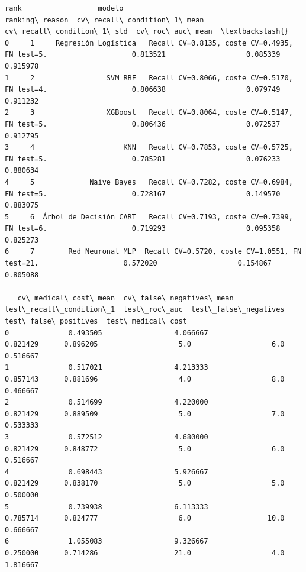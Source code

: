 \documentclass[11pt]{article}
\begin{document}
    \begin{Verbatim}[commandchars=\\\{\}]
   rank                  modelo                                  ranking\_reason  cv\_recall\_condition\_1\_mean  cv\_recall\_condition\_1\_std  cv\_roc\_auc\_mean  \textbackslash{}
0     1     Regresión Logística   Recall CV=0.8135, coste CV=0.4935, FN test=5.                    0.813521                   0.085339         0.915978   
1     2                 SVM RBF   Recall CV=0.8066, coste CV=0.5170, FN test=4.                    0.806638                   0.079749         0.911232   
2     3                 XGBoost   Recall CV=0.8064, coste CV=0.5147, FN test=5.                    0.806436                   0.072537         0.912795   
3     4                     KNN   Recall CV=0.7853, coste CV=0.5725, FN test=5.                    0.785281                   0.076233         0.880634   
4     5             Naive Bayes   Recall CV=0.7282, coste CV=0.6984, FN test=5.                    0.728167                   0.149570         0.883075   
5     6  Árbol de Decisión CART   Recall CV=0.7193, coste CV=0.7399, FN test=6.                    0.719293                   0.095358         0.825273   
6     7        Red Neuronal MLP  Recall CV=0.5720, coste CV=1.0551, FN test=21.                    0.572020                   0.154867         0.805088   

   cv\_medical\_cost\_mean  cv\_false\_negatives\_mean  test\_recall\_condition\_1  test\_roc\_auc  test\_false\_negatives  test\_false\_positives  test\_medical\_cost  
0              0.493505                 4.066667                 0.821429      0.896205                   5.0                   6.0           0.516667  
1              0.517021                 4.213333                 0.857143      0.881696                   4.0                   8.0           0.466667  
2              0.514699                 4.220000                 0.821429      0.889509                   5.0                   7.0           0.533333  
3              0.572512                 4.680000                 0.821429      0.848772                   5.0                   6.0           0.516667  
4              0.698443                 5.926667                 0.821429      0.838170                   5.0                   5.0           0.500000  
5              0.739938                 6.113333                 0.785714      0.824777                   6.0                  10.0           0.666667  
6              1.055083                 9.326667                 0.250000      0.714286                  21.0                   4.0           1.816667  
    \end{Verbatim}
\end{document}

